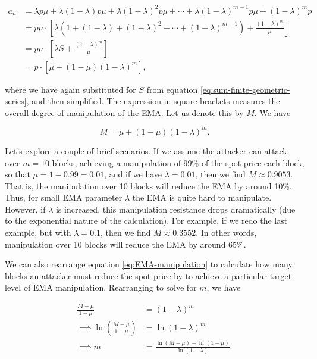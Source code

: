 \documentclass[bibliography=numbered]{article}
\begin{document}
\begin{align}
\label{eq:constant-with-manipulation}
a_{n}
&=
\lambda p \mu + \lambda (1 - \lambda) p \mu + \lambda (1 - \lambda)^2 p \mu + \cdots + \lambda (1 - \lambda)^{m - 1}  p \mu + (1 - \lambda)^m p \\ \nonumber
&=
p \mu \cdot \left[ \lambda \left(1 + (1 - \lambda) + (1 - \lambda)^2 + \cdots + (1 - \lambda)^{m - 1} \right) + \frac{(1 - \lambda)^m}{\mu} \right] \\ \nonumber
&=
p \mu \cdot \left[ \lambda S + \frac{(1 - \lambda)^m}{\mu} \right] \\ \nonumber
&=
p \cdot \left[ \mu + (1 - \mu) (1 - \lambda)^m \right],
\end{align}

where we have again substituted for $S$ from equation \eqref{eq:sum-finite-geometric-series}, and then simplified. The expression in square brackets measures the overall degree of manipulation of the EMA. Let us denote this by $M$. We have

\begin{equation}
    \label{eq:EMA-manipulation}
    M = \mu + (1 - \mu) (1 - \lambda)^m.
\end{equation}

Let's explore a couple of brief scenarios. If we assume the attacker can attack over $m = 10$ blocks, achieving a manipulation of 99\% of the spot price each block, so that $\mu = 1 - 0.99 = 0.01$, and if we have $\lambda = 0.01$, then we find $M \approx 0.9053$. That is, the manipulation over 10 blocks will reduce the EMA by around 10\%. Thus, for small EMA parameter $\lambda$ the EMA is quite hard to manipulate. However, if $\lambda$ is increased, this manipulation resistance drops dramatically (due to the exponential nature of the calculation). For example, if we redo the last example, but with $\lambda = 0.1$, then we find $M \approx 0.3552$. In other words, manipulation over 10 blocks will reduce the EMA by around 65\%.

We can also rearrange equation \eqref{eq:EMA-manipulation} to calculate how many blocks an attacker must reduce the spot price by to achieve a particular target level of EMA manipulation. Rearranging to solve for $m$, we have

\begin{align}
    \frac{M - \mu}{1 - \mu} 
    &= 
    (1 - \lambda)^m \\ \nonumber
    \implies \ln{\left( \frac{M - \mu}{1 - \mu} \right)} &= \ln{(1 - \lambda)^m} \\ \nonumber
    \implies m &= \frac{\ln{( M - \mu)} - \ln{(1 - \mu)}}{\ln{(1 - \lambda)}}.
\end{align}
\end{document}
